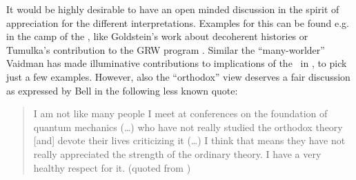 %


It would be highly desirable to have an open minded discussion in the spirit of appreciation for the different interpretations.
Examples for this can be found e.g. in the camp of the \dbb, like Goldstein's work about decoherent histories \cite{page} or Tumulka's
 contribution to the GRW program \cite{rodi}. Similar the ``many-worlder'' Vaidman has made illuminative contributions to implications of
the \dbb\ in \cite{vaidman}, to pick just a few examples. However,  also the ``orthodox'' view deserves a fair discussion as expressed by 
Bell in the following less known quote:
\begin{quote}
I am not like many people I meet at conferences on the foundation of quantum
mechanics (\ldots{}) who have not really studied the orthodox theory [and] devote
their lives criticizing it (\ldots{}) I think that means they have not really
appreciated the strength of the ordinary theory. I have a very healthy respect
for it. (quoted from \cite{quantumreflection})
\end{quote}


